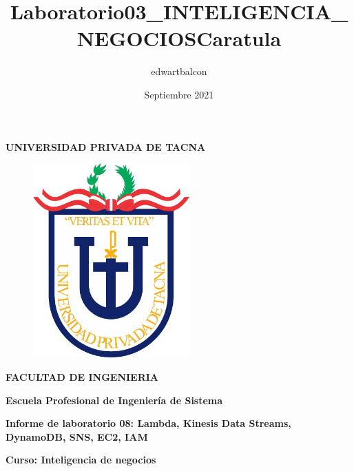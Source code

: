 \documentclass{article}
\title{Laboratorio03_INTELIGENCIA_NEGOCIOS}
\author{edwartbalcon}
\date{Septiembre 2021}
\begin{document}
\title{Caratula}

\begin{titlepage}
\begin{center}
\begin{Large}
\textbf{UNIVERSIDAD PRIVADA DE TACNA} \\
\end{Large}
\vspace*{-0.025in}
\begin{figure}[htb]
\begin{center}
\includegraphics[width=6cm]{./images/logo_UPT}
\end{center}
\end{figure}
\vspace*{-0.025in}
\begin{Large}
\textbf{FACULTAD DE INGENIERIA} \\
\end{Large}
\vspace*{0.05in}
\begin{Large}
\textbf{Escuela Profesional de Ingeniería de Sistema} \\
\end{Large}


\vspace*{0.4in}

\vspace*{0.1in}
\begin{Large}
\textbf{Informe de laboratorio 08: Lambda, Kinesis Data Streams,
DynamoDB, SNS, EC2, IAM} \\
\end{Large}

\vspace*{0.3in}
\begin{Large}
\textbf{Curso: Inteligencia de negocios} \\
\end{Large}


\end{center}
\end{titlepage}
\end{document}
